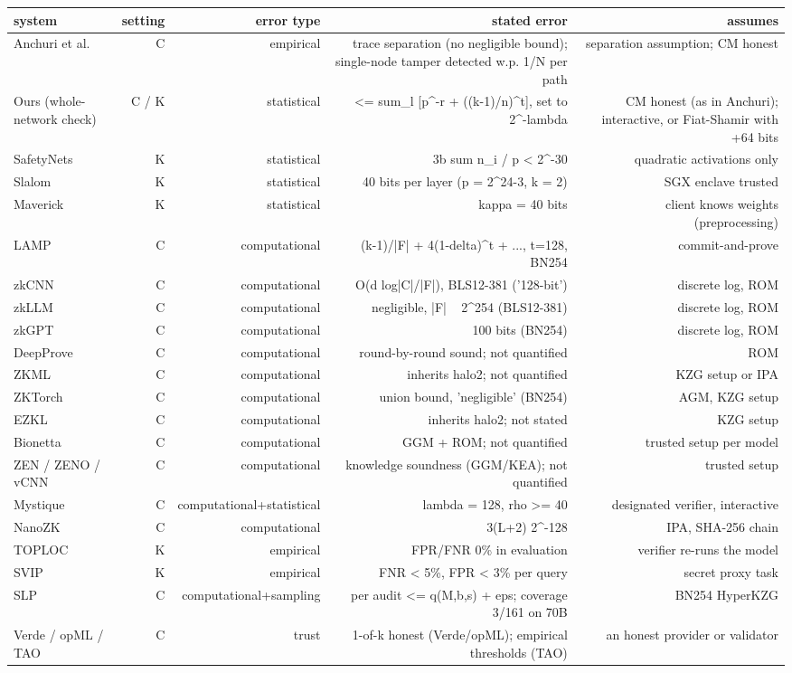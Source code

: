 \begin{tabular}{lrrrr}
\toprule
system & setting & error type & stated error & assumes \\
\midrule
Anchuri et al. & C & empirical & trace separation (no negligible bound); single-node tamper detected w.p. 1/N per path & separation assumption; CM honest \\
Ours (whole-network check) & C / K & statistical & <= sum\_l [p^-r + ((k-1)/n)^t], set to 2^-lambda & CM honest (as in Anchuri); interactive, or Fiat-Shamir with +64 bits \\
SafetyNets & K & statistical & 3b sum n\_i / p < 2^-30 & quadratic activations only \\
Slalom & K & statistical & 40 bits per layer (p = 2^24-3, k = 2) & SGX enclave trusted \\
Maverick & K & statistical & kappa = 40 bits & client knows weights (preprocessing) \\
LAMP & C & computational & (k-1)/|F| + 4(1-delta)^t + ..., t=128, BN254 & commit-and-prove \\
zkCNN & C & computational & O(d log|C|/|F|), BLS12-381 ('128-bit') & discrete log, ROM \\
zkLLM & C & computational & negligible, |F| ~ 2^254 (BLS12-381) & discrete log, ROM \\
zkGPT & C & computational & ~100 bits (BN254) & discrete log, ROM \\
DeepProve & C & computational & round-by-round sound; not quantified & ROM \\
ZKML & C & computational & inherits halo2; not quantified & KZG setup or IPA \\
ZKTorch & C & computational & union bound, 'negligible' (BN254) & AGM, KZG setup \\
EZKL & C & computational & inherits halo2; not stated & KZG setup \\
Bionetta & C & computational & GGM + ROM; not quantified & trusted setup per model \\
ZEN / ZENO / vCNN & C & computational & knowledge soundness (GGM/KEA); not quantified & trusted setup \\
Mystique & C & computational+statistical & lambda = 128, rho >= 40 & designated verifier, interactive \\
NanoZK & C & computational & 3(L+2) 2^-128 & IPA, SHA-256 chain \\
TOPLOC & K & empirical & FPR/FNR 0\% in evaluation & verifier re-runs the model \\
SVIP & K & empirical & FNR < 5\%, FPR < 3\% per query & secret proxy task \\
SLP & C & computational+sampling & per audit <= q(M,b,s) + eps; coverage 3/161 on 70B & BN254 HyperKZG \\
Verde / opML / TAO & C & trust & 1-of-k honest (Verde/opML); empirical thresholds (TAO) & an honest provider or validator \\
\bottomrule
\end{tabular}
